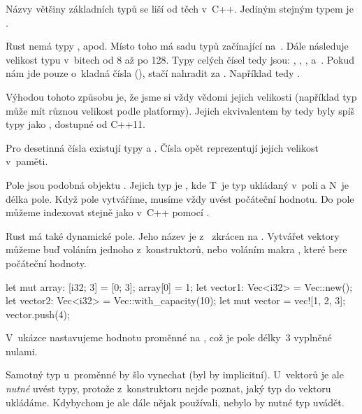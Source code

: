 \documentclass[main.tex]{subfiles}
\begin{document}

Názvy většiny základních typů se liší od těch v~C++. Jediným stejným typem je
.


Rust nemá typy ,  apod. Místo toho má sadu typů začínající
na~. Dále následuje velikost typu v~bitech od 8 až po 128. Typy celých čísel tedy
jsou: , , ,  a~. Pokud nám jde
pouze o~kladná čísla (), stačí nahradit  za . Například
tedy .

Výhodou tohoto způsobu je, že jsme si vždy vědomi jejich velikosti (například typ
 může mít různou velikost podle platformy). Jejich ekvivalentem by tedy byly
spíš typy jako , dostupné od C++11.

Pro desetinná čísla existují typy  a . Čísla opět reprezentují
jejich velikost v~paměti.


Pole jsou podobná objektu . Jejich typ je \irust{[T; N]}, kde T~je typ
ukládaný v~poli a N~je délka pole. Když pole vytváříme, musíme vždy uvést počáteční
hodnotu. Do pole můžeme indexovat stejně jako v~C++ pomocí \icpp{[]}.

Rust má také dynamické pole. Jeho název je z~ zkrácen na .
Vytvářet vektory můžeme buď voláním jednoho z~konstruktorů, nebo voláním makra
, které bere počáteční hodnoty.

\obrazek
\begin{rustcode}
    let mut array: [i32; 3] = [0; 3];
    array[0] = 1;
    let vector1: Vec<i32> = Vec::new();
    let vector2: Vec<i32> = Vec::with_capacity(10);
    let mut vector = vec![1, 2, 3];
    vector.push(4);
\end{rustcode}

V~ukázce nastavujeme hodnotu proměnné  na \irust{[0; 3]}, což je pole délky~3
vyplněné nulami.

Samotný typ u~proměnné  by šlo vynechat (byl by implicitní). U~vektorů je ale
\emph{nutné} uvést typy, protože z~konstruktoru nejde poznat, jaký typ do vektoru
ukládáme. Kdybychom je ale dále nějak používali, nebylo by nutné typ uvádět.

\end{document}
